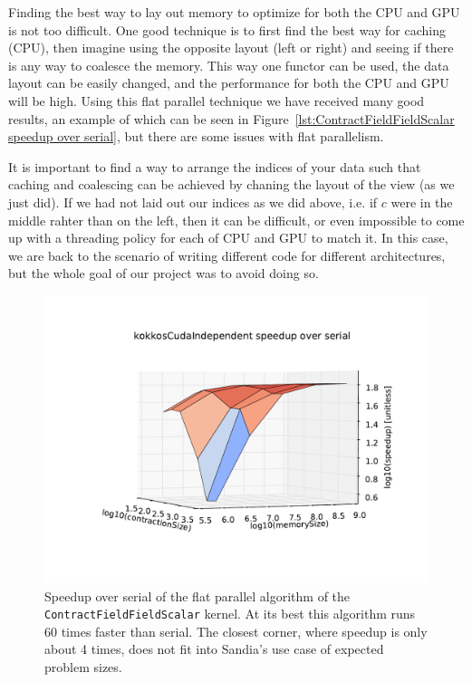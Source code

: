 Finding the best way to lay out memory to optimize for both the CPU and GPU is
not too difficult. One good technique is to first find the best way for caching (CPU),
then imagine using the opposite layout (left or right) and seeing if there is
any way to coalesce the memory. This way one functor can be used, the data
layout can be easily changed, and the performance for both the CPU and GPU will
be high. Using this flat parallel technique we have received many good results,
an example of which can be seen in Figure~\ref{lst:ContractFieldFieldScalar
speedup over serial}, but there are some issues with flat parallelism.

It is important to find a way to arrange the indices of your data such that 
caching and coalescing can be achieved by chaning the layout of the view (as we just did).
If we had not laid out our indices as we did above, i.e. if $c$ were in the middle rahter 
than on the left, then it can be difficult, or even impossible to come up with a threading 
policy for each of CPU and GPU to match it. In this case, we are back to the scenario of 
writing different code for different architectures, but the whole goal of our project 
was to avoid doing so.

\begin{figure}[!ht]
\includegraphics[scale=.8]{CFFS_VersusSerial_kokkosCudaIndependent.pdf}
\caption{Speedup over serial of the flat parallel algorithm of the
\texttt{ContractFieldFieldScalar} kernel. At its best this algorithm runs 60 times
faster than serial. The closest corner, where speedup is only about 4 times,
does not fit into Sandia's use case of expected problem sizes.
\label{lst:ContractFieldFieldScalar speedup over serial}} 
\end{figure}

